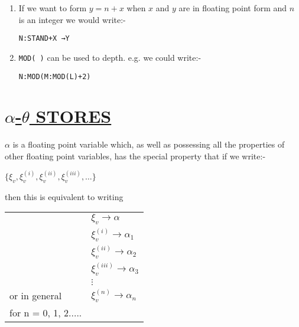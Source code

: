 \documentclass[10pt, a4paper, oneside]{article}
\newcommand{\myuline}[1]{\uline{#1}}
\newcommand{\mytt}[1]{\texttt{\scriptsize #1}}
\newcommand{\mytt}[1]{\texttt{\small #1}}
\begin{document}
\begin{multicols}{2}
\begin{enumerate}
\item\label{it:EIGHT} If we want to form $y = n + x$ when $x$ and $y$ are in
floating point form and $n$ is an integer we would write:-

\begin{addmargin}[1cm]{1em}%
\begin{lstlisting}
N:STAND+X →Y
\end{lstlisting}
\end{addmargin}

\item \mytt{MOD( )} can be used to depth.  e.g. we could write:-

\begin{addmargin}[1cm]{1em}%
\begin{lstlisting}
N:MOD(M:MOD(L)+2)
\end{lstlisting}
\end{addmargin}

\end{enumerate}


\section{\myuline{$\alpha$-$\theta$ STORES}}

$\alpha$ is a floating point variable which, as well as
possessing all the properties of other floating point
variables, has the special property that if we write:-

\begin{addmargin}[1cm]{1em}%
\begin{math}
\{\xi_{v}, \xi_{v}^{(i)}, \xi_{v}^{(ii)}, \xi_{v}^{(iii)}, \ldots \}
\end{math}
\end{addmargin}

then this is equivalent to writing

\begin{addmargin}[1cm]{1em}%
\begin{tabular}{ll}
   & $\xi_{v} \rightarrow \alpha$ \\
   & $\xi_{v}^{(i)} \rightarrow \alpha_{1}$ \\
   & $\xi_{v}^{(ii)} \rightarrow \alpha_{2}$ \\
   & $\xi_{v}^{(iii)} \rightarrow \alpha_{3}$ \\
   & $\vdots$ \\
or in general \hspace{4em}  & $\xi_{v}^{(n)} \rightarrow \alpha_{n}$ \\
for n = 0, 1, 2..... & \\
\end{tabular}
\end{addmargin}


\end{multicols}
\end{document}
